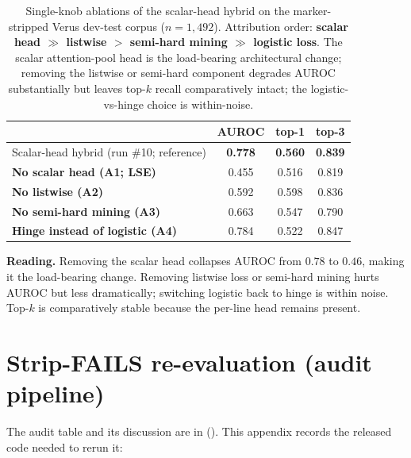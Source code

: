 \documentclass[10pt]{article}
\begin{document}
\begin{table}[htbp]
\centering
\small
\caption{Single-knob ablations of the scalar-head hybrid on the marker-stripped Verus dev-test
corpus ($n{=}1{,}492$). Attribution order:
\textbf{scalar head $\gg$ listwise $>$ semi-hard mining $\gg$ logistic loss}.
The scalar attention-pool head is the load-bearing architectural change;
removing the listwise or semi-hard component degrades AUROC substantially
but leaves top-$k$ recall comparatively intact; the logistic-vs-hinge
choice is within-noise.}
\label{tab:run10-ablation}
\begin{tabular}{lccc}
\toprule
                                     & AUROC          & top-1           & top-3           \\
\midrule
Scalar-head hybrid (run \#10; reference)        & \textbf{0.778} & \textbf{0.560}  & \textbf{0.839}  \\
\textbf{No scalar head (A1; LSE)}     & 0.455          & 0.516           & 0.819           \\
\textbf{No listwise (A2)}              & 0.592          & 0.598           & 0.836           \\
\textbf{No semi-hard mining (A3)}      & 0.663          & 0.547           & 0.790           \\
\textbf{Hinge instead of logistic (A4)}& 0.784          & 0.522           & 0.847           \\
\bottomrule
\end{tabular}
\end{table}

\textbf{Reading.} Removing the scalar head collapses AUROC from $0.78$
to $0.46$, making it the load-bearing change. Removing listwise loss or
semi-hard mining hurts AUROC but less dramatically; switching logistic
back to hinge is within noise. Top-$k$ is comparatively stable because
the per-line head remains present.

\section{Strip-FAILS re-evaluation (audit pipeline)}
\label{app:strip-fails}

The audit table and its discussion are in
(). This appendix records the released
code needed to rerun it:
\end{document}
